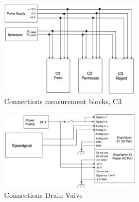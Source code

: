 \begin{figure}[h]
    \centering
    \includegraphics[width=0.6\textwidth]{C3Conn}
    \caption{Connections measurement blocks, C3}
    \label{fig:C3Conn}
\end{figure}

\begin{figure}[h]
    \centering
    \includegraphics[width=0.6\textwidth]{ValveConn}
    \caption{Connections Drain Valve}
    \label{fig:ValveConn}
\end{figure}

\newpage

